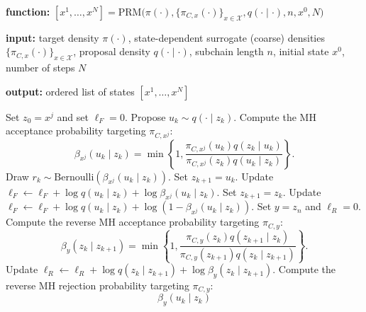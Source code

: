 \documentclass[12pt]{article}
\theoremstyle{definition}
\theoremstyle{remark}
\theoremstyle{plain}
\begin{document}
\begin{algorithm}[H]
  \caption{Pathwise Rat-Mice (PRM)}
  \label{alg:prm}

  \textbf{function:}
  $[x^1,\ldots,x^N]
  =
  \mathrm{PRM}
  \bigl(\pi(\cdot), \{\pi_{C,x}(\cdot)\}_{x\in\mathcal X},
  q(\cdot\mid\cdot), n, x^0, N\bigr)$

  \textbf{input:} target density $\pi(\cdot)$, state-dependent surrogate (coarse)
  densities $\{\pi_{C,x}(\cdot)\}_{x\in\mathcal X}$, proposal density
  $q(\cdot\mid\cdot)$, subchain length $n$, initial state $x^0$, number of steps $N$

  \textbf{output:} ordered list of states $[x^1,\ldots,x^N]$

  \begin{algorithmic}[1]
      \State Set $z_0=x^j$ and set $\ell_F=0$.
          \State Propose $u_k\sim q(\cdot\mid z_k)$.
          \State Compute the MH acceptance probability targeting $\pi_{C,x^j}$:
          \[
              \beta_{x^j}(u_k\mid z_k)
              =
              \min\left\{
              1,
              \frac{
                  \pi_{C,x^j}(u_k)q(z_k\mid u_k)
              }{
                  \pi_{C,x^j}(z_k)q(u_k\mid z_k)
              }
              \right\}.
          \]
          \State Draw $r_k\sim \mathrm{Bernoulli}(\beta_{x^j}(u_k\mid z_k))$.
              \State Set $z_{k+1}=u_k$.
              \State Update $\ell_F \leftarrow \ell_F + \log q(u_k\mid z_k) + \log \beta_{x^j}(u_k\mid z_k)$.
          \Else
              \State Set $z_{k+1}=z_k$.
              \State Update $\ell_F \leftarrow \ell_F + \log q(u_k\mid z_k) + \log\left(1-\beta_{x^j}(u_k\mid z_k)\right)$.
          \EndIf
      \EndFor
      \State Set $y=z_n$ and $\ell_R=0$.
              \State Compute the reverse MH acceptance probability targeting $\pi_{C,y}$:
              \[
                  \beta_y(z_k\mid z_{k+1})
                  =
                  \min\left\{
                  1,
                  \frac{
                      \pi_{C,y}(z_k)q(z_{k+1}\mid z_k)
                  }{
                      \pi_{C,y}(z_{k+1})q(z_k\mid z_{k+1})
                  }
                  \right\}.
              \]
              \State Update $\ell_R \leftarrow \ell_R + \log q(z_k\mid z_{k+1}) + \log \beta_y(z_k\mid z_{k+1})$.
          \Else
              \State Compute the reverse MH rejection probability targeting $\pi_{C,y}$:
              \[
                  \beta_y(u_k\mid z_k)
\]
\end{algorithmic}
\end{algorithm}
\end{document}
